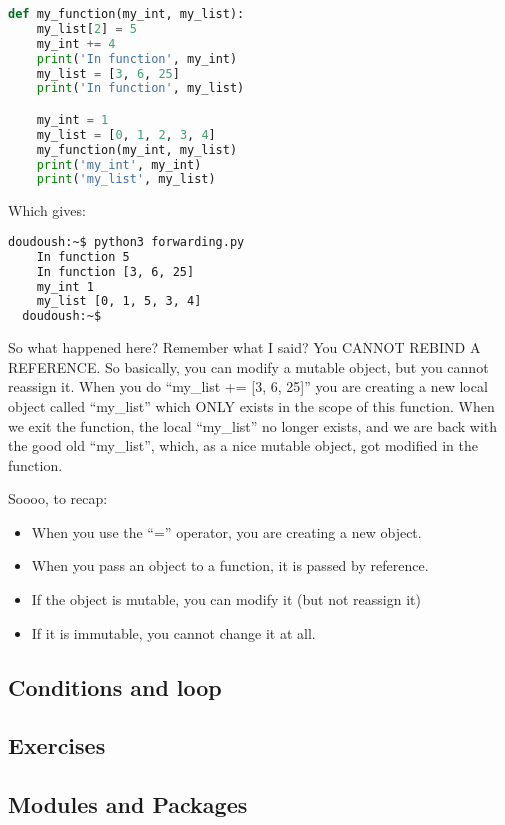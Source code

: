 \begin{lstlisting}[language=python]
  def my_function(my_int, my_list):
    my_list[2] = 5
    my_int += 4
    print('In function', my_int)
    my_list = [3, 6, 25]
    print('In function', my_list)

    my_int = 1
    my_list = [0, 1, 2, 3, 4]
    my_function(my_int, my_list)
    print('my_int', my_int)
    print('my_list', my_list)
\end{lstlisting}

Which gives:

\begin{lstlisting}[language=bash]
  doudoush:~$ python3 forwarding.py
    In function 5
    In function [3, 6, 25]
    my_int 1
    my_list [0, 1, 5, 3, 4]
  doudoush:~$
\end{lstlisting}

So what happened here? Remember what I said? You CANNOT REBIND A REFERENCE.
So basically, you can modify a mutable object, but you cannot reassign it.
When you do ``my\_list += [3, 6, 25]'' you are creating a new local object called ``my\_list''
which ONLY exists in the scope of this function. When we exit the function, the local ``my\_list''
no longer exists, and we are back with the good old ``my\_list'', which, as a nice mutable
object, got modified in the function.

\vspace{5mm}

Soooo, to recap:

\begin{itemize}
\item When you use the ``='' operator, you are creating a new object.
\item When you pass an object to a function, it is passed by reference.
\item If the object is mutable, you can modify it (but not reassign it)
\item If it is immutable, you cannot change it at all.
\end{itemize}

\subsection{Conditions and loop}

\subsection{Exercises}

\subsection{Modules and Packages}

